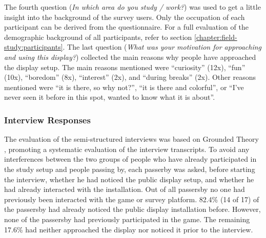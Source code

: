 	The fourth question (\textit{In which area do you study / work?}) was used to get a little insight into the background of the survey users. Only the occupation of each participant can be derived from the questionnaire. For a full evaluation of the demographic background of all participants, refer to section \ref{chapter:field-study:participants}.
	The last question (\textit{What was your motivation for approaching and using this display?}) collected the main reasons why people have approached the display setup. The main reasons mentioned were ``curiosity'' (12x), ``fun'' (10x), ``boredom'' (8x), ``interest'' (2x), and ``during breaks'' (2x). Other reasons mentioned were ``it is there, so why not?'', ``it is there and colorful'', or ``I've never seen it before in this spot, wanted to know what it is about''.




	\subsubsection{Interview Responses}

	The evaluation of the semi-structured interviews was based on Grounded Theory \cite{strauss1990basics}, promoting a systematic evaluation of the interview transcripts.
	To avoid any interferences between the two groups of people who have already participated in the study setup and people passing by, each passerby was asked, before starting the interview, whether he had noticed the public display setup, and whether he had already interacted with the installation. Out of all passersby no one had previously been interacted with the game or survey platform. 82.4\% (14 of 17) of the passersby had already noticed the public display installation before. However, none of the passersby had previously participated in the game. The remaining 17.6\% had neither approached the display nor noticed it prior to the interview. 


